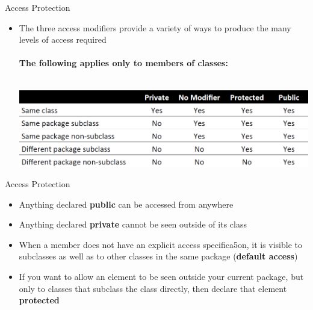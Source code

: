 \documentclass{beamer}
\begin{document}


\begin{frame}{Access Protection}
\begin{itemize}
\item The three access modifiers provide a variety of ways
to produce the many levels of access required \\~\\
\textbf{The following applies only to members of classes:}\\~\\
\centerline{\includegraphics[width=\textwidth]{AccessProtection.png}}
\end{itemize}
\end{frame}



\begin{frame}{Access Protection}
\begin{itemize}
\item Anything declared \textbf{public} can be accessed from
anywhere

\item Anything declared \textbf{private} cannot be seen outside of
its class
\item When a member does not have an explicit access
specifica5on, it is visible to subclasses as well as to
other classes in the same package (\textbf{default access})
\item If you want to allow an element to be seen outside
your current package, but only to classes that subclass
the class directly, then declare that element \textbf{protected}
\end{itemize}
\end{frame}


\end{document}
